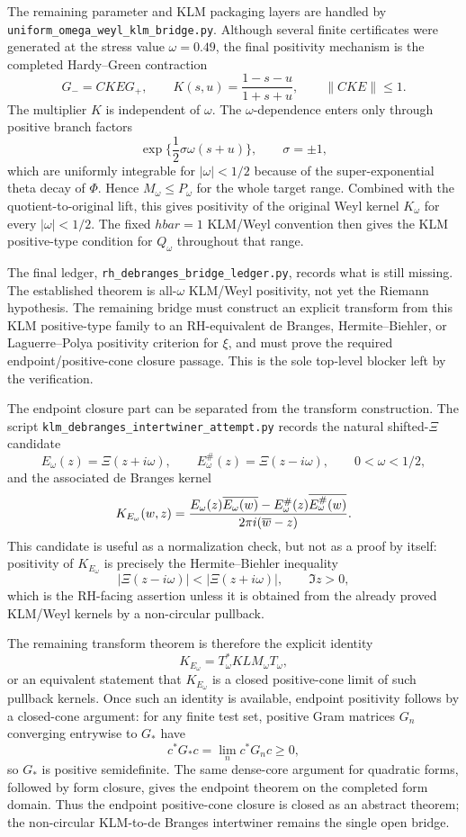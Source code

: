 \documentclass[11pt]{article}
\begin{document}
The remaining parameter and KLM packaging layers are handled by
\texttt{uniform\_omega\_weyl\_klm\_bridge.py}.  Although several finite
certificates were generated at the stress value \(\omega=0.49\), the final
positivity mechanism is the completed Hardy--Green contraction
\[
  G_-=C K E G_+,\qquad
  K(s,u)=\frac{1-s-u}{1+s+u},\qquad
  \|C K E\|\le1 .
\]
The multiplier \(K\) is independent of \(\omega\).  The \(\omega\)-dependence
enters only through positive branch factors
\[
  \exp\{ {\textstyle\frac12}\sigma\omega(s+u)\},\qquad \sigma=\pm1,
\]
which are uniformly integrable for \(|\omega|<1/2\) because of the
super-exponential theta decay of \(\Phi\).  Hence \(M_\omega\le P_\omega\) for
the whole target range.  Combined with the quotient-to-original lift, this
gives positivity of the original Weyl kernel \(K_\omega\) for every
\(|\omega|<1/2\).  The fixed \(hbar=1\) KLM/Weyl convention then gives the KLM
positive-type condition for \(Q_\omega\) throughout that range.

The final ledger, \texttt{rh\_debranges\_bridge\_ledger.py}, records what is
still missing.  The established theorem is all-\(\omega\) KLM/Weyl positivity,
not yet the Riemann hypothesis.  The remaining bridge must construct an
explicit transform from this KLM positive-type family to an RH-equivalent
de Branges, Hermite--Biehler, or Laguerre--Polya positivity criterion for
\(\xi\), and must prove the required endpoint/positive-cone closure passage.
This is the sole top-level blocker left by the verification.

The endpoint closure part can be separated from the transform construction.
The script \texttt{klm\_debranges\_intertwiner\_attempt.py} records the
natural shifted-\(\Xi\) candidate
\[
  E_\omega(z)=\Xi(z+i\omega),\qquad
  E_\omega^\#(z)=\Xi(z-i\omega),\qquad 0<\omega<1/2,
\]
and the associated de Branges kernel
\[
  K_{E_\omega}(w,z)=
  {E_\omega(z)\overline{E_\omega(w)}
   -E_\omega^\#(z)\overline{E_\omega^\#(w)}
  \over
  2\pi i(\overline w-z)}.
\]
This candidate is useful as a normalization check, but not as a proof by
itself: positivity of \(K_{E_\omega}\) is precisely the Hermite--Biehler
inequality
\[
  |\Xi(z-i\omega)|<|\Xi(z+i\omega)|,\qquad \Im z>0,
\]
which is the RH-facing assertion unless it is obtained from the already proved
KLM/Weyl kernels by a non-circular pullback.

The remaining transform theorem is therefore the explicit identity
\[
  K_{E_\omega}=T_\omega^\ast KLM_\omega T_\omega,
\]
or an equivalent statement that \(K_{E_\omega}\) is a closed positive-cone
limit of such pullback kernels.  Once such an identity is available, endpoint
positivity follows by a closed-cone argument: for any finite test set,
positive Gram matrices \(G_n\) converging entrywise to \(G_\ast\) have
\[
  c^\ast G_\ast c=\lim_n c^\ast G_n c\ge0,
\]
so \(G_\ast\) is positive semidefinite.  The same dense-core argument for
quadratic forms, followed by form closure, gives the endpoint theorem on the
completed form domain.  Thus the endpoint positive-cone closure is closed as
an abstract theorem; the non-circular KLM-to-de Branges intertwiner remains
the single open bridge.
\end{document}
